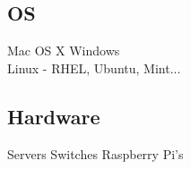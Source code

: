 \documentclass[]{deedy-resume}
\begin{document}
\begin{minipage}[t]{0.33\textwidth}
\subsection{OS}
Mac OS X \textbullet{}
Windows \\
Linux - RHEL, Ubuntu, Mint... \\

\subsection{Hardware}
Servers \textbullet{}
Switches \textbullet{}
Raspberry Pi's \\


%
%

\end{minipage} 
\hfill
\end{document}
